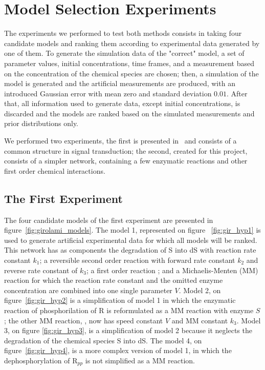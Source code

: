 \section{Model Selection Experiments}
The experiments we performed to test both methods consists in taking 
four candidate models and ranking them according to experimental data 
generated by one of them. To generate the simulation data of the 
"correct" model, a set of parameter values, initial concentrations, time 
frames, and a measurement based on the concentration of the chemical 
species are chosen; then, a simulation of the model is generated and the 
artificial measurements are produced, with an introduced Gaussian error 
with mean zero and standard deviation $0.01$. After that, all 
information used to generate data, except initial concentrations, is 
discarded and the models are ranked based on the simulated measurements 
and prior distributions only.

We performed two experiments, the first is presented 
in~\cite{Vyshemirsky2007} and consists of a common structure in signal 
transduction; the second, created for this project, consists of a 
simpler network, containing a few enzymatic reactions and other first 
order chemical interactions.

\subsection{The First Experiment}
\label{sec:experiment_one}
The four candidate models of the first experiment are presented in 
figure~\ref{fig:girolami_models}. The model 1, represented on figure
~\ref{fig:gir_hyp1} is used to generate artificial experimental data
for which all models will be ranked. This network has as components the
degradation of S into dS with reaction rate constant $k_1$; a reversible 
second order reaction  with forward rate constant $k_2$ 
and reverse rate constant of $k_3$; a first order reaction 
; and a Michaelis-Menten (MM) reaction  
for which the reaction rate constant and the omitted enzyme 
concentration are combined into one single parameter $V$. Model 2, on 
figure~\ref{fig:gir_hyp2} is a simplification of model 1 in which the
enzymatic reaction of phosphorilation of R is reformulated as a 
MM reaction with enzyme $S$; the other MM reaction, , 
now has speed constant $V$ and MM constant $k_3$. Model 3, on figure
\ref{fig:gir_hyp3}, is a simplification of model 2 because it neglects 
the degradation of the chemical species S into dS. The model 4, on 
figure~\ref{fig:gir_hyp4}, is a more complex version of model 1, in 
which the dephosphorylation of R$_{pp}$ is not simplified as a MM 
reaction.

